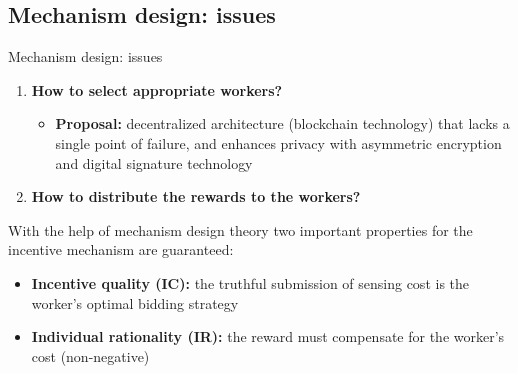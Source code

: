 \subsection{Mechanism design: issues}

\begin{frame}{Mechanism design: issues}
  		\begin{enumerate}
   			\item \textbf{How to select appropriate workers?}
   				\begin{itemize}
   					\item \textbf{Proposal: } decentralized architecture (blockchain technology) that lacks a single point of failure, and enhances privacy with asymmetric encryption and digital signature technology
   				\end{itemize}
    		\item \textbf{How to distribute the rewards to the workers?}
  		\end{enumerate}
  		With the help of \alert{mechanism design theory}\cite{article56} two important properties for the incentive mechanism are guaranteed:
  		\begin{itemize}
   					\item \textbf{Incentive quality (IC):} the truthful submission of sensing  cost is the worker's optimal bidding strategy
   					\item \textbf{Individual rationality (IR):} the reward must compensate for the worker's cost (non-negative)
   		\end{itemize}
\end{frame}
